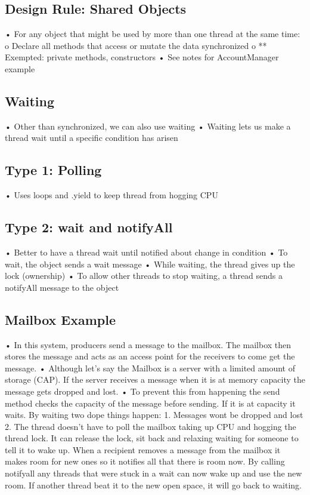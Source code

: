 \documentclass[11pt]{article}
\begin{document}
\subsection{Design Rule: Shared Objects}
• For any object that might be used by more than one thread at the same time:
o Declare all methods that access or mutate the data synchronized
o ** Exempted: private methods, constructors
• See notes for AccountManager example
\subsection{Waiting}
• Other than synchronized, we can also use waiting
• Waiting lets us make a thread wait until a specific condition has arisen
\subsection{Type 1: Polling}
• Uses loops and .yield to keep thread from hogging CPU
\subsection{Type 2: wait and notifyAll}
• Better to have a thread wait until notified about change in condition
• To wait, the object sends a wait message
• While waiting, the thread gives up the lock (ownership)
• To allow other threads to stop waiting, a thread sends a notifyAll message to the object
\subsection{Mailbox Example}
• In this system, producers send a message to the mailbox. The mailbox then stores the message and
acts as an access point for the receivers to come get the message.
• Although let’s say the Mailbox is a server with a limited amount of storage (CAP). If the server
receives a message when it is at memory capacity the message gets dropped and lost.
• To prevent this from happening the send method checks the capacity of the message before
sending. If it is at capacity it waits. By waiting two dope things happen: 1. Messages wont be dropped
and lost 2. The thread doesn't have to poll the mailbox taking up CPU and hogging the thread lock. It
can release the lock, sit back and relaxing waiting for someone to tell it to wake up. 
When a recipient removes a message from the mailbox it makes room for new ones so it notifies all that
there is room now. By calling notifyall any threads that were stuck in a wait can now wake up and use the
new room. If another thread beat it to the new open space, it will go back to waiting.
\end{document}
